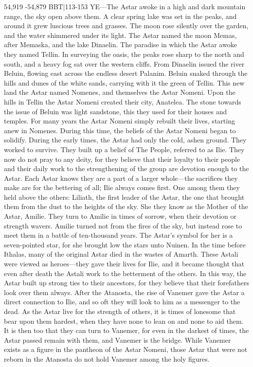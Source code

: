 \documentclass[smalldemyvopaper,11pt,twoside,onecolumn,openright,extrafontsizes]{memoir}
\begin{document}
54,919 -54,879 BBT|113-153 YE—The Astar awoke in a high and dark mountain range, the sky open above them. A clear spring lake was set in the peaks, and around it grew luscious trees and grasses. The moon rose silently over the garden, and the water shimmered under its light. The Astar named the moon Memas, after Memaska, and the lake Dinaelin. The paradise in which the Astar awoke they named Tellin. In surveying the oasis, the peaks rose sharp to the north and south, and a heavy fog sat over the western cliffs. From Dinaelin issued the river Beluin, flowing east across the endless desert Palanim. Beluin snaked through the hills and dunes of the white sands, carrying with it the green of Tellin. This new land the Astar named Nomenes, and themselves the Astar Nomeni. Upon the hills in Tellin the Astar Nomeni created their city, Anatelea. The stone towards the issue of Beluin was light sandstone, this they used for their houses and temples. For many years the Astar Nomeni simply rebuilt their lives, starting anew in Nomenes. During this time, the beliefs of the Astar Nomeni began to solidify.
	During the early times, the Astar had only the cold, ashen ground. They worked to survive. They built up a belief of The People, referred to as Ilie. They now do not pray to any deity, for they believe that their loyalty to their people and their daily work to the strengthening of the group are devotion enough to the Astar. Each Astar knows they are a part of a larger whole—the sacrifices they make are for the bettering of all; Ilie always comes first. One among them they held above the others: Liliath, the first leader of the Astar, the one that brought them from the dust to the heights of the sky. She they know as the Mother of the Astar, Amilie. They turn to Amilie in times of sorrow, when their devotion or strength wavers. Amilie turned not from the fires of the sky, but instead rose to meet them in a battle of ten-thousand years. The Astar’s symbol for her is a seven-pointed star, for she brought low the stars unto Nuinen.
In the time before Ithalas, many of the original Astar died in the wastes of Amarth. These Astali were viewed as heroes—they gave their lives for Ilie, and it became thought that even after death the Astali work to the betterment of the others. In this way, the Astar built up strong ties to their ancestors, for they believe that their forefathers look over them always. After the Atanosta, the rise of Vanemer gave the Astar a direct connection to Ilie, and so oft they will look to him as a messenger to the dead. As the Astar live for the strength of others, it is times of lonesome that bear upon them hardest, when they have none to lean on and none to aid them. It is then too that they can turn to Vanemer, for even in the darkest of times, the Astar passed remain with them, and Vanemer is the bridge. While Vanemer exists as a figure in the pantheon of the Astar Nomeni, those Astar that were not reborn in the Atanosta do not hold Vanemer among the holy figures.
\end{document}

